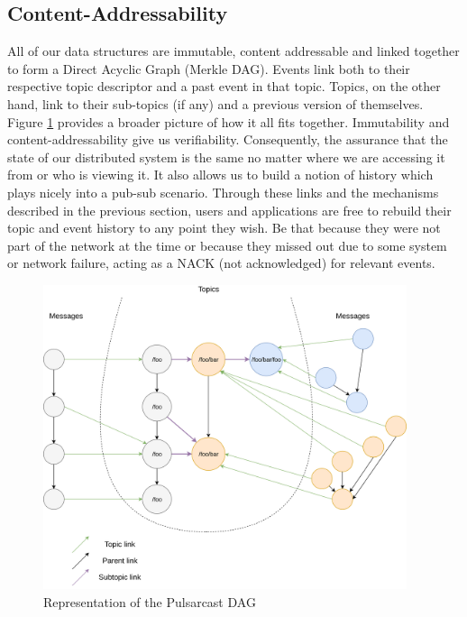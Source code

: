 \subsection{Content-Addressability}\label{subsec:content-addressability}

All of our data structures are immutable, content addressable and linked
together to form a Direct Acyclic Graph (Merkle DAG). Events link both to their
respective topic descriptor and a past event in that topic. Topics, on the
other hand, link to their sub-topics (if any) and a previous version of
themselves.  Figure \ref{fig:pulsarcast-dag} provides a broader picture of how
it all fits together. Immutability and content-addressability give us
verifiability. Consequently, the assurance that the state of our distributed
system is the same no matter where we are accessing it from or who is viewing
it. It also allows us to build a notion of history which plays nicely into a
pub-sub scenario. Through these links and the mechanisms described in the
previous section, users and applications are free to rebuild their topic and
event history to any point they wish. Be that because they were not part of the
network at the time or because they missed out due to some system or network
failure, acting as a NACK (not acknowledged) for relevant events.

\begin{figure}[hb!]
  \centering
  \includegraphics[width=0.95\textwidth]{img/pulsarcast-dag.png}
  \caption{Representation of the Pulsarcast DAG}
  \label{fig:pulsarcast-dag}
\end{figure}

